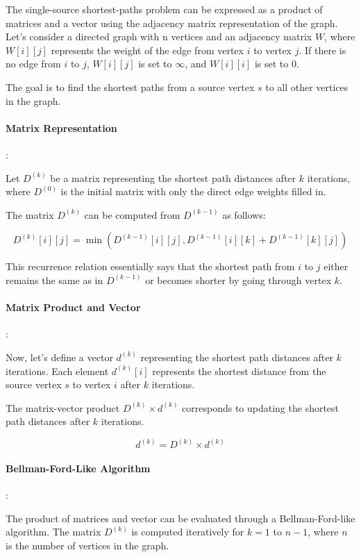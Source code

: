 \documentclass{article}
\begin{document}
The single-source shortest-paths problem can be expressed as a product of matrices and a vector using the adjacency matrix representation of the graph. Let's consider a directed graph with n vertices and an adjacency matrix \(W\), where \(W[i][j]\) represents the weight of the edge from vertex \(i\) to vertex \(j\). If there is no edge from \(i\) to \(j\), \(W[i][j]\) is set to \(\infty\), and \(W[i][i]\) is set to 0.

The goal is to find the shortest paths from a source vertex \(s\) to all other vertices in the graph.

\paragraph{Matrix Representation}:

Let \(D^{(k)}\) be a matrix representing the shortest path distances after \(k\) iterations, where \(D^{(0)}\) is the initial matrix with only the direct edge weights filled in.

The matrix \(D^{(k)}\) can be computed from \(D^{(k-1)}\) as follows:

\[D^{(k)}[i][j] = \min(D^{(k-1)}[i][j], D^{(k-1)}[i][k] + D^{(k-1)}[k][j])\]

This recurrence relation essentially says that the shortest path from \(i\) to \(j\) either remains the same as in \(D^{(k-1)}\) or becomes shorter by going through vertex \(k\).

\paragraph{Matrix Product and Vector}:

Now, let's define a vector \(d^{(k)}\) representing the shortest path distances after \(k\) iterations. Each element \(d^{(k)}[i]\) represents the shortest distance from the source vertex \(s\) to vertex \(i\) after \(k\) iterations.

The matrix-vector product \(D^{(k)} \times d^{(k)}\) corresponds to updating the shortest path distances after \(k\) iterations.

\[d^{(k)} = D^{(k)} \times d^{(k)}\]

\paragraph{Bellman-Ford-Like Algorithm}:

The product of matrices and vector can be evaluated through a Bellman-Ford-like algorithm. The matrix \(D^{(k)}\) is computed iteratively for \(k = 1\) to \(n-1\), where \(n\) is the number of vertices in the graph.
\end{document}
